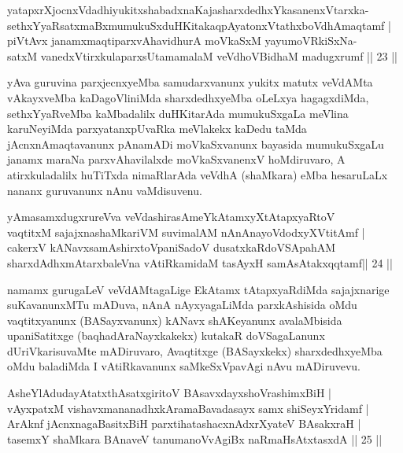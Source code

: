 \begin{shl}
yatapxrXjocnxVdadhiyukitxshabadxnaKajasharxdedhxYkasanenxVtarxka-\\
sethxYyaRsatxmaBxmumukuSxduHKitakaqpAyatonxVtathxboVdhAmaqtamf | \\
piVtAvx janamxmaqtiparxvAhavidhurA moVkaSxM yayumoVRkiSxNa-\\
satxM vanedxV\s tirxkulaparxsUtamamalaM veVdhoVBidhaM madugxrumf \hfill||  23 ||  
\end{shl}

\begin{artha}
yAva guruvina parxjecnxyeMba samudarxvanunx yukitx matutx veVdAMta 
vAkayxveMba kaDagoVliniMda sharxdedhxyeMba oLeLxya hagagxdiMda, 
sethxYyaRveMba kaMbadalilx duHKitarAda mumukuSxgaLa meVlina 
karuNeyiMda parxyatanxpUvaRka meVlakekx kaDedu taMda 
jAcnxnAmaqtavanunx pAnamADi moVkaSxvanunx bayasida mumukuSxgaLu janamx 
maraNa parxvAhavilalxde moVkaSxvanenxV hoMdiruvaro, A atirxkuladalilx 
huTiTxda nimaRlarAda veVdhA (shaMkara) eMba hesaruLaLx nananx 
guruvanunx nAnu vaMdisuvenu.
\end{artha}

\begin{shl}
yAmasamxdugxrureVva veVdashirasAmeYkAtamxyXtAtapxyaRtoV \\
vaqtitxM sajajxnashaMkariVM suvimalAM nAnAnayoVdodxyXVtitAmf | \\
cakerxV kANavxsamAshirxtoVpaniSadoV dusatxkaRdoVSApahAM \\
sharxdAdhxmAtarxbaleVna vAtiRkamidaM tasAyxH samAsAtakxqqtamf\hfill ||  24 ||  
\end{shl}

\begin{artha}
namamx gurugaLeV veVdAMtagaLige EkAtamx tAtapxyaRdiMda sajajxnarige 
suKavanunxMTu mADuva, nAnA nAyxyagaLiMda parxkAshisida oMdu 
vaqtitxyanunx (BASayxvanunx) kANavx shAKeyanunx avalaMbisida 
upaniSatitxge (baqhadAraNayxkakekx) kutakaR doVSagaLanunx 
dUriVkarisuvaMte mADiruvaro, Avaqtitxge (BASayxkekx) sharxdedhxyeMba 
oMdu baladiMda I vAtiRkavanunx saMkeSxVpavAgi nAvu mADiruvevu.
\end{artha}

\begin{shl}
AsheYlAdudayAtatxthAsatxgiritoV BAsavxdayxshoVrashimxBiH |\\
vAyxpatxM vishavxmananadhxkAramaBavadasayx samx shiSeyxYridamf |\\
ArAknf jAcnxnagaBasitxBiH parxtihatashacxnAdxrXyateV BAsakxraH |\\
tasemxY shaMkara BAnaveV tanumanoVvAgiBx naRmaHsAtxtasxdA \hfill|| 25 ||
\end{shl}

